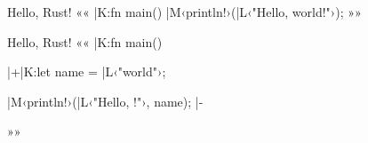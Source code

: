\documentclass{beamer}
\begin{document}
\begin{frame}
\thispagestyle{empty}\centering
{}
\end{frame}

\begin{frame}[fragile]{Hello, Rust!}{}
««
|K:fn main() {
	|M‹println!›(|L‹"Hello, world!"›);
}
»»
\end{frame}

\begin{frame}[fragile]{Hello, Rust!}{}
««
|K:fn main() {
	|+|K:let name = |L‹"world"›;

  |M‹println!›(|L‹"Hello, {}!"›, name); |-
}
»»
\end{frame}
\end{document}
